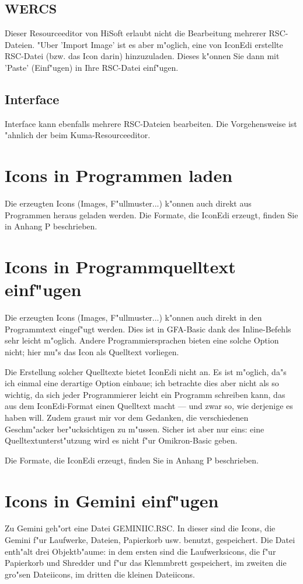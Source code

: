 \subsection{WERCS} 
Dieser Resourceeditor von HiSoft erlaubt nicht die Bearbeitung 
mehrerer RSC-Dateien. "Uber 'Import Image' ist es aber m"oglich, eine
von IconEdi erstellte RSC-Datei (bzw. das Icon darin) hinzuzuladen.
Dieses k"onnen Sie dann mit 'Paste' (Einf"ugen) in Ihre
RSC-Datei einf"ugen.

\subsection{Interface} 
Interface kann ebenfalls mehrere RSC-Dateien bearbeiten. Die
Vorgehensweise ist "ahnlich der beim Kuma-Resourceeditor.

\section{Icons in Programmen laden}
Die erzeugten Icons (Images, F"ullmuster...) k"onnen auch 
direkt aus Programmen heraus geladen werden. Die Formate,
die IconEdi erzeugt, finden Sie in Anhang P beschrieben.

\section{Icons in Programmquelltext einf"ugen}
Die erzeugten Icons (Images, F"ullmuster...) k"onnen auch 
direkt in den Programmtext eingef"ugt werden. Dies ist in 
GFA-Basic dank des Inline-Befehls sehr leicht m"oglich.
Andere Programmiersprachen bieten eine solche Option nicht;
hier mu"s das Icon als Quelltext vorliegen.

Die Erstellung solcher Quelltexte bietet IconEdi nicht an.
Es ist m"oglich, da"s ich einmal eine derartige Option einbaue;
ich betrachte dies aber nicht als so wichtig, da sich jeder
Programmierer leicht ein Programm schreiben kann, das aus dem
IconEdi-Format einen Quelltext macht --- und zwar so, wie
derjenige es haben will. Zudem graust mir vor dem Gedanken,
die verschiedenen Geschm"acker ber"ucksichtigen zu m"ussen.
Sicher ist aber nur eins: eine Quelltextunterst"utzung 
wird es nicht f"ur Omikron-Basic geben. 

Die Formate, die IconEdi erzeugt, finden Sie in Anhang P 
beschrieben.

\section{Icons in Gemini einf"ugen} 
Zu Gemini geh"ort eine Datei GEMINIIC.RSC. In dieser sind die
Icons, die Gemini f"ur Laufwerke, Dateien, Papierkorb usw. benutzt,
gespeichert. Die Datei enth"alt drei Objektb"aume: in dem ersten
sind die Laufwerksicons, die f"ur Papierkorb und Shredder und 
f"ur das Klemmbrett gespeichert, im zweiten die gro"sen Dateiicons,
im dritten die kleinen Dateiicons.
 
